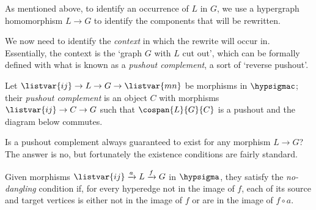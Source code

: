 As mentioned above, to identify an occurrence of \(L\) in \(G\), we use a
hypergraph homomorphism \(L \to G\) to identify the components that will be
rewritten.

\begin{center}
\end{center}

We now need to identify the \emph{context} in which the rewrite will occur in.
Essentially, the context is the `graph \(G\) with \(L\) cut out', which can be
formally defined with what is known as a \emph{pushout complement}, a sort of
`reverse pushout'.

\begin{definition}\label{def:pushout-complement}
    Let \(\listvar{ij} \to L \to G \rightarrow \listvar{mn}\) be morphisms in
    \(\hypsigmac\); their \emph{pushout complement} is an object \(C\)
    with morphisms \(\listvar{ij} \to C \to G\) such that \(\cospan{L}{G}{C}\) is a
    pushout and the diagram below commutes.
    \begin{center}
    \end{center}
\end{definition}

Is a pushout complement always guaranteed to exist for any morphism \(L \to G\)?
The answer is no, but fortunately the existence conditions are fairly standard.

\begin{definition}
    Given morphisms \(\listvar{ij} \xrightarrow{a} L \xrightarrow{f} G\) in
    \(\hypsigma\), they satisfy the \emph{no-dangling} condition if, for every
    hyperedge not in
    the image of \(f\), each of its source and target vertices is either not in
    the image of \(f\) or are in the image of \(f \circ a\).
\end{definition}

